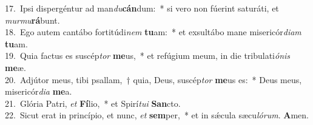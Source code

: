 {17.~}Ipsi dispergéntur ad man\textit{du}\textbf{cán}dum:~* si vero non fúerint saturáti, et \textit{mur}\textit{mu}\textbf{rá}bunt.\\
{18.~}Ego autem cantábo fortitúdi\textit{nem} \textbf{tu}am:~* et exsultábo mane misericór\textit{di}\textit{am} \textbf{tu}am.\\
{19.~}Quia factus es suscép\textit{tor} \textbf{me}us,~* et refúgium meum, in die tribulati\textit{ó}\textit{nis} \textbf{me}æ.\\
{20.~}Adjútor meus, tibi psallam,~† quia, Deus, suscép\textit{tor} \textbf{me}us es:~* Deus meus, misericór\textit{di}\textit{a} \textbf{me}a.\\
{21.~}Glória Patri, \textit{et} \textbf{Fí}lio,~* et Spirí\textit{tu}\textit{i} \textbf{San}cto.\\
{22.~}Sicut erat in princípio, et nunc, \textit{et} \textbf{sem}per,~* et in sǽcula sæcu\textit{ló}\textit{rum}. \textbf{A}men.\\
